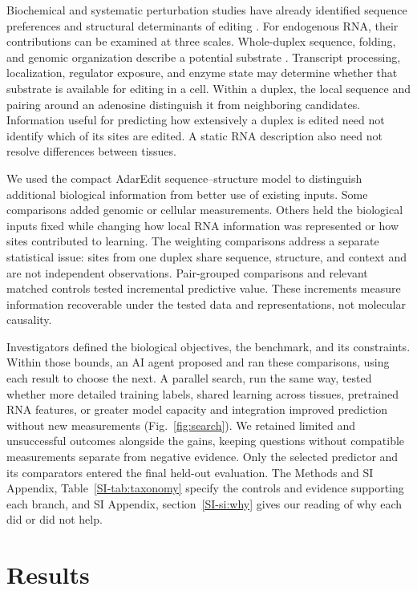 \documentclass[9pt,twocolumn,twoside]{pnas-new}
\newcommand{\SIref}[1]{\ref*{SI-#1}}
\begin{document}
Biochemical and systematic perturbation studies have already identified sequence preferences and structural determinants of editing \cite{Eggington2011,Wong2001,Lehmann2000,Uzonyi2021,ZambranoMila2023}. For endogenous RNA, their contributions can be examined at three scales. Whole-duplex sequence, folding, and genomic organization describe a potential substrate \cite{Bazak2014Editability}. Transcript processing, localization, regulator exposure, and enzyme state may determine whether that substrate is available for editing in a cell. Within a duplex, the local sequence and pairing around an adenosine distinguish it from neighboring candidates. Information useful for predicting how extensively a duplex is edited need not identify which of its sites are edited. A static RNA description also need not resolve differences between tissues.

We used the compact AdarEdit sequence--structure model to distinguish additional biological information from better use of existing inputs. Some comparisons added genomic or cellular measurements. Others held the biological inputs fixed while changing how local RNA information was represented or how sites contributed to learning. The weighting comparisons address a separate statistical issue: sites from one duplex share sequence, structure, and context and are not independent observations. Pair-grouped comparisons and relevant matched controls tested incremental predictive value. These increments measure information recoverable under the tested data and representations, not molecular causality.

Investigators defined the biological objectives, the benchmark, and its constraints. Within those bounds, an AI agent proposed and ran these comparisons, using each result to choose the next. A parallel search, run the same way, tested whether more detailed training labels, shared learning across tissues, pretrained RNA features, or greater model capacity and integration improved prediction without new measurements (Fig.~\ref{fig:search}). We retained limited and unsuccessful outcomes alongside the gains, keeping questions without compatible measurements separate from negative evidence. Only the selected predictor and its comparators entered the final held-out evaluation. The Methods and SI Appendix, Table~\SIref{tab:taxonomy} specify the controls and evidence supporting each branch, and SI Appendix, section~\SIref{si:why} gives our reading of why each did or did not help.

\section*{Results}
\end{document}

